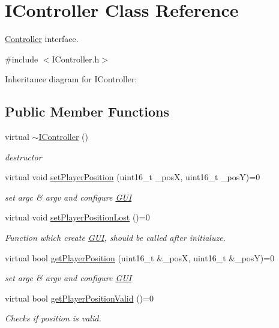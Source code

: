 \hypertarget{class_i_controller}{\section{I\+Controller Class Reference}
\label{class_i_controller}
}


\hyperlink{class_controller}{Controller} interface.  




{\ttfamily \#include $<$I\+Controller.\+h$>$}



Inheritance diagram for I\+Controller\+:
\subsection*{Public Member Functions}
\begin{DoxyCompactItemize}
\item 
virtual \hyperlink{class_i_controller_a30b618142be776fd779255998a540e08}{$\sim$\+I\+Controller} ()
\begin{DoxyCompactList}\small\item\em destructor \end{DoxyCompactList}\item 
virtual void \hyperlink{class_i_controller_a4131a7d4cf16f6592ae22ba7df301a55}{set\+Player\+Position} (uint16\+\_\+t \+\_\+pos\+X, uint16\+\_\+t \+\_\+pos\+Y)=0
\begin{DoxyCompactList}\small\item\em set argc \& argv and configure \hyperlink{class_g_u_i}{G\+U\+I} \end{DoxyCompactList}\item 
virtual void \hyperlink{class_i_controller_ae8f1bbd2e4a1d7fbcc81d39cb7d15437}{set\+Player\+Position\+Lost} ()=0
\begin{DoxyCompactList}\small\item\em Function which create \hyperlink{class_g_u_i}{G\+U\+I}, should be called after initialuze. \end{DoxyCompactList}\item 
virtual bool \hyperlink{class_i_controller_a64ccc2f21138196540bee209479b79e7}{get\+Player\+Position} (uint16\+\_\+t \&\+\_\+pos\+X, uint16\+\_\+t \&\+\_\+pos\+Y)=0
\begin{DoxyCompactList}\small\item\em set argc \& argv and configure \hyperlink{class_g_u_i}{G\+U\+I} \end{DoxyCompactList}\item 
virtual bool \hyperlink{class_i_controller_af5e9e8a8d33bf64aa6629340dd73eb4d}{get\+Player\+Position\+Valid} ()=0
\begin{DoxyCompactList}\small\item\em Checks if position is valid. \end{DoxyCompactList}\end{DoxyCompactItemize}
